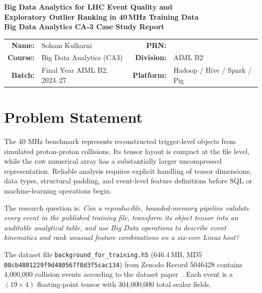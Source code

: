 \documentclass[11pt,a4paper]{article}
\begin{document}
\begin{center}
    {\huge \bfseries \color{primary} Big Data Analytics for LHC Event Quality and\\[0.3em] Exploratory Outlier Ranking in 40\,MHz Training Data}\\[0.7em]
    {\large \bfseries Big Data Analytics CA-3 Case Study Report}\\[1.0em]
    \begin{tabularx}{\textwidth}{r>{\raggedright\arraybackslash}X r>{\raggedright\arraybackslash}X}
        \toprule
        \textbf{Name:} & Soham Kulkarni & \textbf{PRN:} & 23070126129 \\
        \textbf{Course:} & Big Data Analytics (CA3) & \textbf{Division:} & AIML B2 \\
        \textbf{Batch:} & Final Year AIML B2, 2023--27 & \textbf{Platform:} & Hadoop / Hive / Spark / Pig \\
        \bottomrule
    \end{tabularx}
\end{center}
\vspace{0.4em}


\section{Problem Statement}

The 40 MHz benchmark represents reconstructed trigger-level objects from simulated proton-proton collisions. Its tensor layout is compact at the file level, while the raw numerical array has a substantially larger uncompressed representation. Reliable analysis requires explicit handling of tensor dimensions, data types, structural padding, and event-level feature definitions before SQL or machine-learning operations begin.

The research question is: \emph{Can a reproducible, bounded-memory pipeline validate every event in the published training file, transform its object tensor into an auditable analytical table, and use Big Data operations to describe event kinematics and rank unusual feature combinations on a six-core Linux host?}

The dataset file \texttt{background\_for\_training.h5} ($646.4\,\text{MB}$, MD5 \texttt{08cb4801229f9d480567f8d3f5cac134}) from Zenodo Record 5046428 contains 4,000,000 collision events according to the dataset paper~\cite{govorkova2022lhc}. Each event is a $(19 \times 4)$ floating-point tensor with 304,000,000 total scalar fields.
\end{document}
